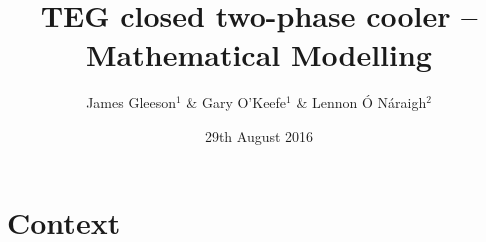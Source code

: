 \documentclass[10pt,mathserif]{beamer}
\begin{document}
%


  \title[TEG closed two-phase cooler]{TEG closed two-phase cooler -- Mathematical Modelling}
  \author[]{
James Gleeson$^{\text{1}}$ \&
Gary O'Keefe$^{\text{1}}$ \&
Lennon \'O N\'araigh$^{\text{2}}$
}
  \date{29th August 2016}

\begin{frame}
    \titlepage
\end{frame}

\section{Context}
\end{document}

